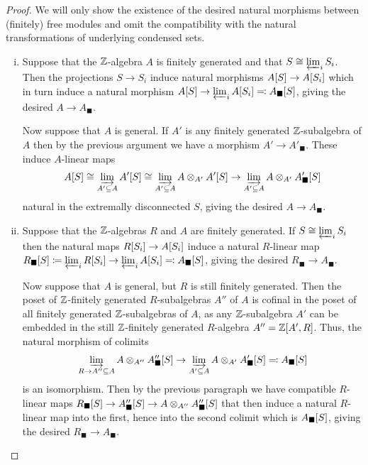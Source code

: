 \begin{proof}
	We will only show the existence of the desired natural morphisms between (finitely) free modules and omit the compatibility with the natural transformations of underlying condensed sets.
	\begin{enumerate}[(i)]
		\item
		Suppose that the ${\mathbb{Z}}$-algebra $A$ is finitely generated and that $S \cong \varprojlim_i S_i$. Then the projections $S\to S_i$ induce natural morphisms ${A[S]}\to {A[S_i]}$ which in turn induce a natural morphism ${A[S]} \to \varprojlim_i {A[S_i]} \eqqcolon {A_\blacksquare[S]}$, giving the desired $A\to A_\blacksquare$.
		
		Now suppose that $A$ is general. If $A'$ is any finitely generated ${\mathbb{Z}}$-subalgebra of $A$ then by the previous argument we have a morphism $A'\to A'_\blacksquare$. These induce $A$-linear maps
		$${A[S]} \cong \varinjlim_{A'\subseteq A} {A'[S]}\cong \varinjlim_{A'\subseteq A} A\otimes_{A'} {A'[S]} \to \varinjlim_{A'\subseteq A} A\otimes_{A'}{A'_\blacksquare[S]}$$
		natural in the extremally disconnected $S$, giving the desired $A\to A_\blacksquare$.
		
		\item
		Suppose that the ${\mathbb{Z}}$-algebras $R$ and $A$ are finitely generated. If $S\cong \varprojlim_i S_i$ then the natural maps ${R[S_i]} \to {A[S_i]}$ induce a natural $R$-linear map ${R_\blacksquare[S]} \coloneqq \varprojlim_i {R[S_i]} \to \varprojlim_i {A[S_i]} \eqqcolon {A_\blacksquare[S]}$, giving the desired $R_\blacksquare\to A_\blacksquare$.
		
		Now suppose that $A$ is general, but $R$ is still finitely generated. Then the poset of ${\mathbb{Z}}$-finitely generated $R$-subalgebras $A''$ of $A$ is cofinal in the poset of all finitely generated ${\mathbb{Z}}$-subalgebras of $A$, as any ${\mathbb{Z}}$-subalgebra $A'$ can be embedded in the still ${\mathbb{Z}}$-finitely generated $R$-algebra $A''={\mathbb{Z}}[A', R]$. Thus, the natural morphism of colimits
		$$\varinjlim_{R\to A''\subseteq A} A\otimes_{A''}{A''_\blacksquare[S]} \to \varinjlim_{A'\subseteq A} A\otimes_{A'}{A'_\blacksquare[S]}\eqqcolon {A_\blacksquare[S]}$$
		is an isomorphism. Then by the previous paragraph we have compatible $R$-linear maps ${R_\blacksquare[S]} \to {A''_\blacksquare[S]} \to A\otimes_{A''} {A''_\blacksquare[S]}$ that then induce a natural $R$-linear map into the first, hence into the second colimit which is ${A_\blacksquare[S]}$, giving the desired $R_\blacksquare \to A_\blacksquare$.
		

\end{enumerate}
\end{proof}
